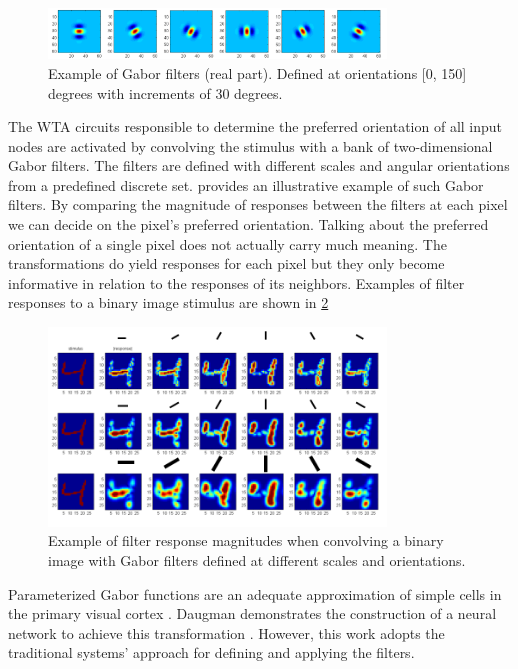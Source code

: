 \documentclass{report}
\begin{document}
\begin{figure}[ht]
\centering
\includegraphics[width=0.8\textwidth]{filters_real}
\caption{Example of Gabor filters (real part). Defined at orientations [0, 150] degrees with increments of 30 degrees. \label{fig:filters_real}}
\end{figure}

The WTA circuits responsible to determine the preferred orientation of all input nodes are activated by convolving the stimulus with a bank of two-dimensional Gabor filters. The filters are defined with different scales and angular orientations from a predefined discrete set.  provides an illustrative example of such Gabor filters. By comparing the magnitude of responses between the filters at each pixel we can decide on the pixel's preferred orientation. Talking about the preferred orientation of a single pixel does not actually carry much meaning. The transformations do yield responses for each pixel but they only become informative in relation to the responses of its neighbors. Examples of filter responses to a binary image stimulus are shown in \cref{fig:response4}

\begin{figure}[ht]
\centering
\includegraphics[width=0.8\textwidth]{response4}
\caption{Example of filter response magnitudes when convolving a binary image with Gabor filters defined at different scales and orientations.
\label{fig:response4}}
\end{figure}

Parameterized Gabor functions are an adequate approximation of simple cells in the primary visual cortex \cite{Serre04realisticmodeling, Long2008}. Daugman demonstrates the construction of a neural network to achieve this transformation \cite{Daugman1988}. However, this work adopts the traditional systems' approach for defining and applying the filters.
\end{document}
